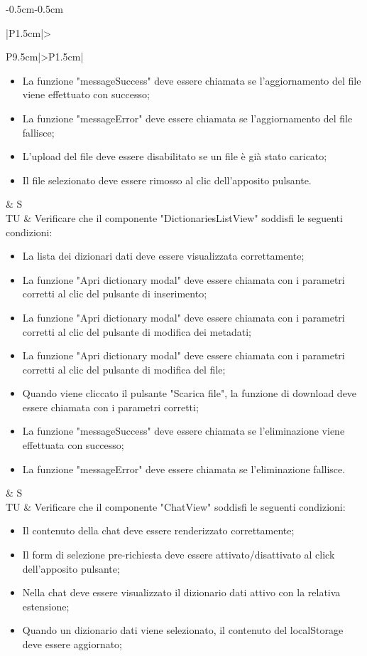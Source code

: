 \begin{adjustwidth}{-0.5cm}{-0.5cm}
\begin{longtable}{|P{1.5cm}|>{\raggedright}P{9.5cm}|>{\arraybackslash}P{1.5cm}|}
\begin{itemize}
			\item La funzione "messageSuccess" deve essere chiamata se l'aggiornamento del file viene effettuato con successo;
			\item La funzione "messageError" deve essere chiamata se l'aggiornamento del file fallisce;
			\item L'upload del file deve essere disabilitato se un file è già stato caricato;
			\item Il file selezionato deve essere rimosso al clic dell'apposito pulsante.
    \end{itemize} & S \\
		\hline TU & Verificare che il componente "DictionariesListView" soddisfi le seguenti condizioni:
    \begin{itemize}
      \item La lista dei dizionari dati deve essere visualizzata correttamente;
			\item La funzione "Apri dictionary modal" deve essere chiamata con i parametri corretti al clic del pulsante di inserimento;
			\item La funzione "Apri dictionary modal" deve essere chiamata con i parametri corretti al clic del pulsante di modifica dei metadati;
			\item La funzione "Apri dictionary modal" deve essere chiamata con i parametri corretti al clic del pulsante di modifica del file;
			\item Quando viene cliccato il pulsante "Scarica file", la funzione di download deve essere chiamata con i parametri corretti;
			\item La funzione "messageSuccess" deve essere chiamata se l'eliminazione viene effettuata con successo;
			\item La funzione "messageError" deve essere chiamata se l'eliminazione fallisce.
    \end{itemize} & S \\
		\hline TU & Verificare che il componente "ChatView" soddisfi le seguenti condizioni:
    \begin{itemize}
      \item Il contenuto della chat deve essere renderizzato correttamente;
			\item Il form di selezione pre-richiesta deve essere attivato/disattivato al click dell'apposito pulsante;
			\item Nella chat deve essere visualizzato il dizionario dati attivo con la relativa estensione;
			\item Quando un dizionario dati viene selezionato, il contenuto del localStorage deve essere aggiornato;

\end{itemize}
\end{longtable}
\end{adjustwidth}
